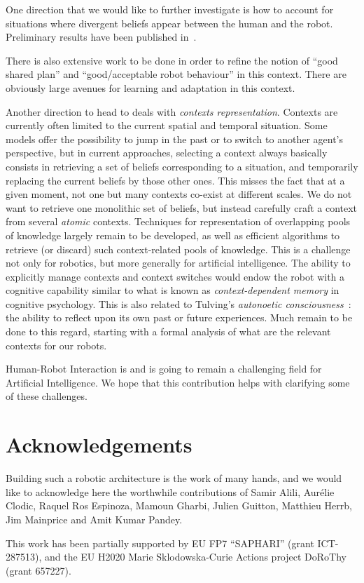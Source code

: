 \documentclass[preprint,3p,times]{elsarticle}
\begin{document}
One direction that we would like to further investigate is how to account for
situations where divergent beliefs appear between the human and the robot.
Preliminary results have been published in~\cite{warnier2012when}.

There is also extensive work to be done in order to refine the notion of ``good
shared plan'' and ``good/acceptable robot behaviour'' in this context. There are
obviously large avenues for learning and adaptation in this context.

Another direction to head to deals with \emph{contexts representation}.
Contexts are currently often limited to the current spatial and temporal
situation. Some models offer the possibility to jump in the past or to switch to
another agent's perspective, but in current approaches, selecting a context
always basically consists in retrieving a set of beliefs corresponding to a
situation, and temporarily replacing the current beliefs by those other ones.
This misses the fact that at a given moment, not one but many contexts co-exist
at different scales. We do not want to retrieve one monolithic set of beliefs,
but instead carefully craft a context from several \emph{atomic} contexts.
Techniques for representation of overlapping pools of knowledge largely remain
to be developed, as well as efficient algorithms to retrieve (or discard) such
context-related pools of knowledge. This is a challenge not only for robotics,
but more generally for artificial intelligence.  The ability to explicitly
manage contexts and context switches would endow the robot with a cognitive
capability similar to what is known as \emph{context-dependent memory} in
cognitive psychology. This is also related to Tulving's \emph{autonoetic
consciousness}~\cite{Tulving1985a}: the ability to reflect upon its own past or
future experiences.  Much remain to be done to this regard, starting with a
formal analysis of what are the relevant contexts for our robots.

Human-Robot Interaction is and is going to remain a challenging field for
Artificial Intelligence. We hope that this contribution helps with clarifying
some of these challenges.

\section*{Acknowledgements}

Building such a robotic architecture is the work of many hands, and we would
like to acknowledge here the worthwhile contributions of Samir Alili, Aurélie
Clodic, Raquel Ros Espinoza, Mamoun Gharbi, Julien Guitton, Matthieu Herrb, Jim
Mainprice and Amit Kumar Pandey.

This work has been partially supported by EU FP7 ``SAPHARI'' (grant ICT-287513),
and the EU H2020 Marie Sklodowska-Curie Actions project DoRoThy (grant 657227).




%

\end{document}
